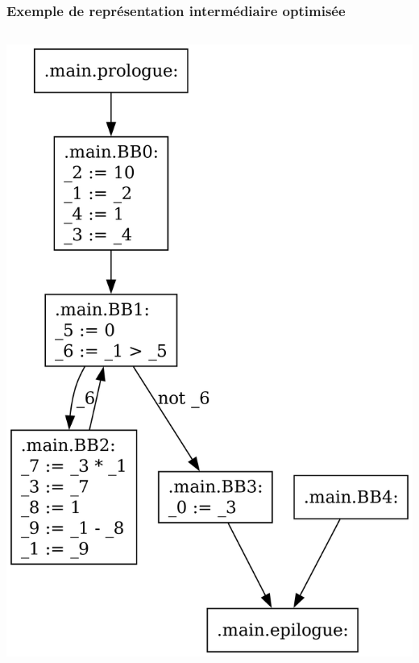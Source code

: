 \documentclass{beamer}
\begin{document}
\begin{frame}[fragile]
    \frametitle{Exemple de représentation intermédiaire optimisée}

    \begin{columns}
        \begin{column}{.5\textwidth}
            \begin{center}
                \includegraphics[width=\textwidth,height=0.8\textheight,keepaspectratio]{graphs/fact_no_opti.dot.png}
            \end{center}
        \end{column}


\end{columns}
\end{frame}
\end{document}
